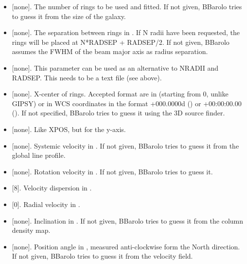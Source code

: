 \documentclass[letterpaper,10pt,english]{sphinxmanual}
\begin{document}
\begin{itemize}
\item {} 
 {[}none{]}. The number of rings to be used and fitted. If not given, BBarolo tries to guess it from the size of the galaxy.

\item {} 
 {[}none{]}. The separation between rings in . If N radii have been requested, the rings will be placed at N*RADSEP + RADSEP/2. If not given, BBarolo assumes the FWHM of the beam major axis as radius separation.

\item {} 
 {[}none{]}. This parameter can be used as an alternative to NRADII and RADSEP. This needs to be a text file (see above).

\item {} 
 {[}none{]}. X-center of rings. Accepted format are in  (starting from 0, unlike GIPSY) or in WCS coordinates in the format +000.0000d () or +00:00:00.00 (). If not specified, BBarolo tries to guess it using the 3D source finder.

\item {} 
 {[}none{]}. Like XPOS, but for the y-axis.

\item {} 
 {[}none{]}. Systemic velocity in . If not given, BBarolo tries to guess it from the global line profile.

\item {} 
 {[}none{]}. Rotation velocity in . If not given, BBarolo tries to guess it.

\item {} 
 {[}8{]}. Velocity dispersion in .

\item {} 
 {[}0{]}. Radial velocity in .

\item {} 
 {[}none{]}. Inclination in . If not given, BBarolo tries to guess it from the column density map.

\item {} 
 {[}none{]}. Position angle in , measured anti-clockwise form the North direction. If not given, BBarolo tries to guess it from the velocity field.


\end{itemize}
\end{document}

